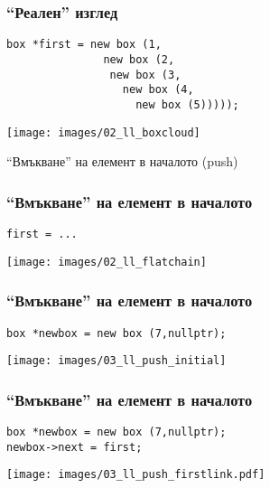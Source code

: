 \documentclass{beamer}
\begin{document}
\begin{frame}[fragile]
\frametitle{``Реален'' изглед}

\begin{flushleft}
\begin{lstlisting}
box *first = new box (1,
               new box (2, 
                new box (3, 
                  new box (4, 
                    new box (5)))));
\end{lstlisting}  
\end{flushleft}


\texttt{[image: images/02\_ll\_boxcloud]}

\end{frame}



\begin{frame}
\centerline{``Вмъкване'' на елемент в началото (push)}
\end{frame}



\begin{frame}[fragile]
\frametitle{``Вмъкване'' на елемент в началото}

\begin{flushleft}
\begin{lstlisting}
first = ...
\end{lstlisting}  
\end{flushleft}


\texttt{[image: images/02\_ll\_flatchain]}

\end{frame}


\begin{frame}[fragile]
\frametitle{``Вмъкване'' на елемент в началото}

\begin{flushleft}
\begin{lstlisting}
box *newbox = new box (7,nullptr);
\end{lstlisting}  
\end{flushleft}


\texttt{[image: images/03\_ll\_push\_initial]}

\end{frame}

\begin{frame}[fragile]
\frametitle{``Вмъкване'' на елемент в началото}

\begin{flushleft}
\begin{lstlisting}
box *newbox = new box (7,nullptr);
newbox->next = first;
\end{lstlisting}  
\end{flushleft}


\texttt{[image: images/03\_ll\_push\_firstlink.pdf]}

\end{frame}
\end{document}
